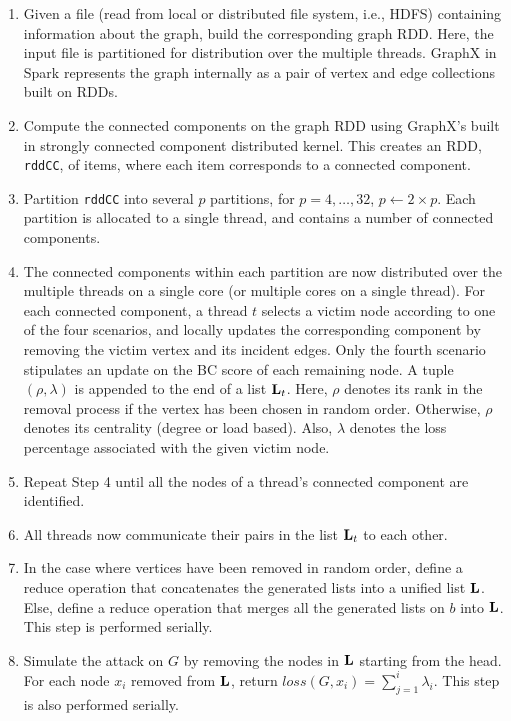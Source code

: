 \begin{enumerate}
\item Given a file (read from local or distributed file system, i.e., HDFS) containing information about the graph, build the corresponding graph RDD. Here, the input file is partitioned for distribution over the multiple threads. GraphX in Spark represents the graph internally as a pair of vertex and edge collections built on RDDs. 
\item Compute the connected components on the graph RDD using GraphX's built in strongly connected component distributed kernel. This creates an RDD, \texttt{rddCC}, of items, where each item corresponds to a connected component. 
\item Partition \texttt{rddCC} into several $p$ partitions, for $p = 4, \ldots, 32$, $p \leftarrow 2\times p$. Each partition is allocated to a single thread, and contains a number of connected components.  

\item The connected components within each partition are now distributed over the multiple threads on a single core (or multiple cores on a single thread). For each connected component, a thread $t$ selects a victim node according to one of the four scenarios, and locally updates the corresponding component by removing the victim vertex and its incident edges. Only the fourth scenario stipulates an update on the BC score of each remaining node. A tuple $(\rho,\lambda)$ is appended to the end of a list ${\bf L}_t$. Here, $\rho$ denotes its rank in the removal process if the vertex has been chosen in random order. Otherwise, $\rho$ denotes its centrality (degree or load based). Also, $\lambda$ denotes the loss percentage associated with the given victim node. 
\item Repeat Step 4 until all the nodes of a thread's connected component are identified. 
\item All threads now communicate their pairs in the list ${\bf L}_t$ to each other.
\item In the case where vertices have been removed in random order, define a reduce operation that concatenates the generated lists into a unified list ${\bf L}$. Else, define a reduce operation that merges all the generated lists on $b$ into ${\bf L}$. This step is performed serially.
\item Simulate the attack on $G$ by removing the nodes in ${\bf L}$ starting from the head. For each node $x_i$ removed from ${\bf L}$, return $loss(G,x_i) = \sum_{j = 1}^{i} \lambda_i$. This step is also performed serially.
\end{enumerate}
